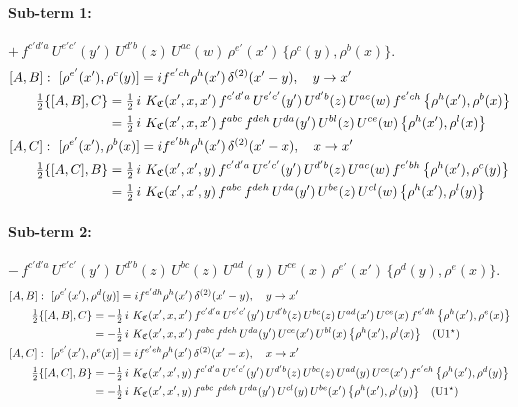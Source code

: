 \documentclass[10pt]{article}
\numberwithin{equation}{section}
\begin{document}
\paragraph{Sub-term 1:} $+\,f^{c'd'a}\,U^{e'c'}(y')\,U^{d'b}(z)\,U^{ac}(w)\,\rho^{e'}(x')\,\big\{\rho^{c}(y),\rho^{b}(x)\big\}$.
\begin{align}
&[A,B]:\ [\rho^{e'}(x'),\rho^{c}(y)]=i f^{e'ch}\rho^{h}(x')\,\delta^{(2)}(x'-y),\quad y\to x'\notag\\
&\qquad \tfrac12\{[A,B],C\}=\tfrac12\,i\,\,K_{\mathfrak C}(x',x,x')\,f^{c'd'a}\,U^{e'c'}(y')\,U^{d'b}(z)\,U^{ac}(w)\,f^{e'ch}\,\big\{\rho^{h}(x'),\rho^{b}(x)\big\}\notag\\
&\qquad\phantom{\tfrac12\{[A,B],C\}}=\tfrac12\,i\,\,K_{\mathfrak C}(x',x,x')\,f^{abc}\,f^{deh}\,U^{da}(y')\,U^{bl}(z)\,U^{ce}(w)\,\big\{\rho^{h}(x'),\rho^{l}(x)\big\}
\label{eq:GIII.III-1-AB}\\
&[A,C]:\ [\rho^{e'}(x'),\rho^{b}(x)]=i f^{e'bh}\rho^{h}(x')\,\delta^{(2)}(x'-x),\quad x\to x'\notag\\
&\qquad \tfrac12\{[A,C],B\}=\tfrac12\,i\,\,K_{\mathfrak C}(x',x',y)\,f^{c'd'a}\,U^{e'c'}(y')\,U^{d'b}(z)\,U^{ac}(w)\,f^{e'bh}\,\big\{\rho^{h}(x'),\rho^{c}(y)\big\}\notag\\
&\qquad\phantom{\tfrac12\{[A,C],B\}}=\tfrac12\,i\,\,K_{\mathfrak C}(x',x',y)\,f^{abc}\,f^{deh}\,U^{da}(y')\,U^{be}(z)\,U^{cl}(w)\,\big\{\rho^{h}(x'),\rho^{l}(y)\big\}
\label{eq:GIII.III-1-AC}
\end{align}
\paragraph{Sub-term 2:} $-\,f^{c'd'a}\,U^{e'c'}(y')\,U^{d'b}(z)\,U^{bc}(z)\,U^{ad}(y)\,U^{ce}(x)\,\rho^{e'}(x')\,\big\{\rho^{d}(y),\rho^{e}(x)\big\}$.
\begin{align}
&[A,B]:\ [\rho^{e'}(x'),\rho^{d}(y)]=i f^{e'dh}\rho^{h}(x')\,\delta^{(2)}(x'-y),\quad y\to x'\notag\\
&\qquad \tfrac12\{[A,B],C\}=-\tfrac12\,i\,\,K_{\mathfrak C}(x',x,x')\,f^{c'd'a}\,U^{e'c'}(y')\,U^{d'b}(z)\,U^{bc}(z)\,U^{ad}(x')\,U^{ce}(x)\,f^{e'dh}\,\big\{\rho^{h}(x'),\rho^{e}(x)\big\}\notag\\
&\qquad\phantom{\tfrac12\{[A,B],C\}}=-\tfrac12\,i\,\,K_{\mathfrak C}(x',x,x')\,f^{abc}\,f^{deh}\,U^{da}(y')\,U^{ce}(x')\,U^{bl}(x)\,\big\{\rho^{h}(x'),\rho^{l}(x)\big\}\quad\text{(U1$^\star$)}
\label{eq:GIII.III-2-AB}\\
&[A,C]:\ [\rho^{e'}(x'),\rho^{e}(x)]=i f^{e'eh}\rho^{h}(x')\,\delta^{(2)}(x'-x),\quad x\to x'\notag\\
&\qquad \tfrac12\{[A,C],B\}=-\tfrac12\,i\,\,K_{\mathfrak C}(x',x',y)\,f^{c'd'a}\,U^{e'c'}(y')\,U^{d'b}(z)\,U^{bc}(z)\,U^{ad}(y)\,U^{ce}(x')\,f^{e'eh}\,\big\{\rho^{h}(x'),\rho^{d}(y)\big\}\notag\\
&\qquad\phantom{\tfrac12\{[A,C],B\}}=-\tfrac12\,i\,\,K_{\mathfrak C}(x',x',y)\,f^{abc}\,f^{deh}\,U^{da}(y')\,U^{cl}(y)\,U^{be}(x')\,\big\{\rho^{h}(x'),\rho^{l}(y)\big\}\quad\text{(U1$^\star$)}
\label{eq:GIII.III-2-AC}
\end{align}
\end{document}
